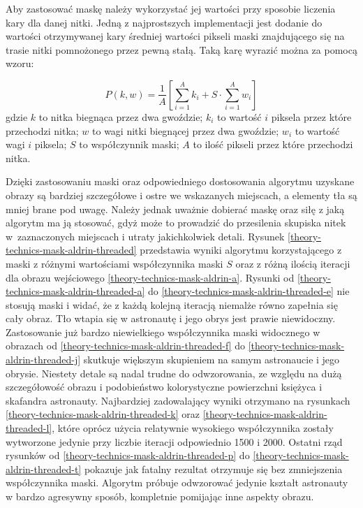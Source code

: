        Aby zastosować maskę należy wykorzystać jej wartości przy sposobie liczenia kary dla danej nitki. Jedną z najprostszych implementacji jest dodanie do wartości otrzymywanej kary średniej wartości pikseli maski znajdującego się na trasie nitki pomnożonego przez pewną stałą. Taką karę wyrazić można za pomocą wzoru:
        
        \begin{equation} \label{theory-technics-mask-penalty}
            P(k, w) = \frac{1}{A} \left[\sum_{i=1}^A k_i + S \cdot \sum_{i=1}^A w_i \right]
        \end{equation}
        gdzie \(k\) to nitka biegnąca przez dwa gwoździe; \(k_i\) to wartość \(i\) piksela przez które przechodzi nitka; \(w\) to wagi nitki biegnącej przez dwa gwoździe; \(w_i\) to wartość wagi \(i\) piksela; \(S\) to współczynnik maski; \(A\) to ilość pikseli przez które przechodzi nitka.
        
        Dzięki zastosowaniu maski oraz odpowiedniego dostosowania algorytmu uzyskane obrazy są bardziej szczegółowe i ostre we wskazanych miejscach, a elementy tła są mniej brane pod uwagę. Należy jednak uważnie dobierać maskę oraz siłę z jaką algorytm ma ją stosować, gdyż może to prowadzić do przesilenia skupiska nitek w~zaznaczonych miejscach i utraty jakichkolwiek detali. Rysunek \ref{theory-technics-mask-aldrin-threaded} przedstawia wyniki algorytmu korzystającego z maski z różnymi wartościami współczynnika maski \(S\) oraz z różną ilością iteracji dla obrazu wejściowego \ref{theory-technics-mask-aldrin-a}. Rysunki od \ref{theory-technics-mask-aldrin-threaded-a} do \ref{theory-technics-mask-aldrin-threaded-e} nie stosują maski i widać, że z każdą kolejną iteracją niemalże równo zapełnia się cały obraz. Tło wtapia się w astronautę i jego obrys jest prawie niewidoczny. Zastosowanie już bardzo niewielkiego współczynnika maski widocznego w obrazach od \ref{theory-technics-mask-aldrin-threaded-f} do \ref{theory-technics-mask-aldrin-threaded-j} skutkuje większym skupieniem na samym astronaucie i jego obrysie. Niestety detale są nadal trudne do odwzorowania, ze względu na dużą szczegółowość obrazu i podobieństwo kolorystyczne powierzchni księżyca i skafandra astronauty. Najbardziej zadowalający wyniki otrzymano na rysunkach \ref{theory-technics-mask-aldrin-threaded-k} oraz \ref{theory-technics-mask-aldrin-threaded-l}, które oprócz użycia relatywnie wysokiego współczynnika zostały wytworzone jedynie przy liczbie iteracji odpowiednio 1500 i 2000. Ostatni rząd rysunków od \ref{theory-technics-mask-aldrin-threaded-p} do \ref{theory-technics-mask-aldrin-threaded-t} pokazuje jak fatalny rezultat otrzymuje się bez zmniejszenia współczynnika maski. Algorytm próbuje odwzorować jedynie kształt astronauty w bardzo agresywny sposób, kompletnie pomijając inne aspekty obrazu.
        
